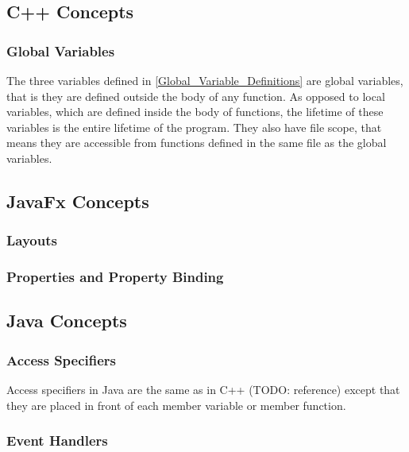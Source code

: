 \subsection{C++ Concepts}

\subsubsection{Global Variables} 

The three variables defined in \ref{Global_Variable_Definitions} are global variables, that is they are defined outside the body of any function. As opposed to local variables, which are defined inside the body of functions, the lifetime of these variables is the entire lifetime of the program. They also have file scope, that means they are accessible from functions defined in the same file as the global variables.

\subsection{JavaFx Concepts}

\subsubsection{Layouts}
\subsubsection{Properties and Property Binding}

\subsection {Java Concepts}

\subsubsection{Access Specifiers}

Access specifiers in Java are the same as in C++ (TODO: reference) except that they are placed in front of each member variable or member function.

\subsubsection {Event Handlers}
